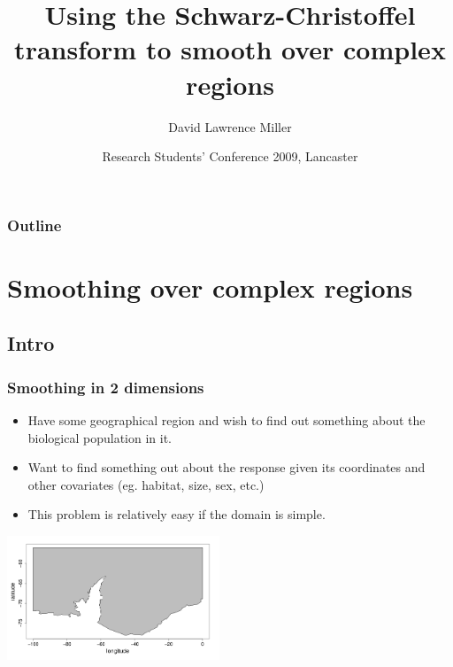\documentclass[ignorenonframetext]{beamer} %
\title[Smoothing over complex regions]{Using the Schwarz-Christoffel transform to smooth over complex regions}
\author[Miller]{David Lawrence Miller}
\institute{Mathematical Sciences\\University of Bath}
\date[24 March 2009] {Research Students' Conference 2009, Lancaster}
\newcommand{\bc}{\begin{center}}
\newcommand{\ec}{\end{center}}
\newcommand{\bi}{\begin{itemize}}
\newcommand{\ei}{\end{itemize}}
\begin{document}
\begin{frame}
  \titlepage
\end{frame}


 {
\begin{frame}
  \frametitle{Outline}
  \tableofcontents %
\end{frame}
}

\section{Smoothing over complex regions}

\subsection{Intro}

\begin{frame}
	\frametitle{Smoothing in 2 dimensions}
       \bi
         \item Have some geographical region and wish to find out something about the biological population in it. 
         \item Want to find something out about the response given its coordinates and other covariates (eg. habitat, size, sex, etc.) 
         \item This problem is relatively easy if the domain is simple.
       \ei
       \bc
         \includegraphics[width=2.5in]{figs/peninsula}
       \ec
\end{frame}
\end{document}
